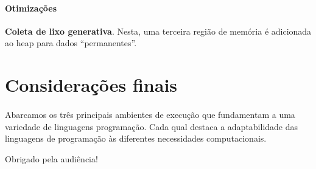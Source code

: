 \documentclass{beamer}
\newcommand{\slide}[2]{
	\begin{frame}{\insertsection}
		\framesubtitle{#1}
		#2
	\end{frame}
}
\begin{document}
\slide{Otimizações}{
	\textbf{Coleta de lixo generativa}. Nesta, uma terceira região de memória é
	adicionada ao heap para dados ``permanentes''.
}

\section{Considerações finais}


\slide{}{
	Abarcamos os três principais ambientes de execução que fundamentam a uma
	variedade de linguagens programação. \pause Cada qual destaca a adaptabilidade das linguagens de programação às diferentes necessidades computacionais.

	\vspace{2cm}
	\pause\centering
	Obrigado pela audiência! \twemoji{wave}
}
\end{document}
